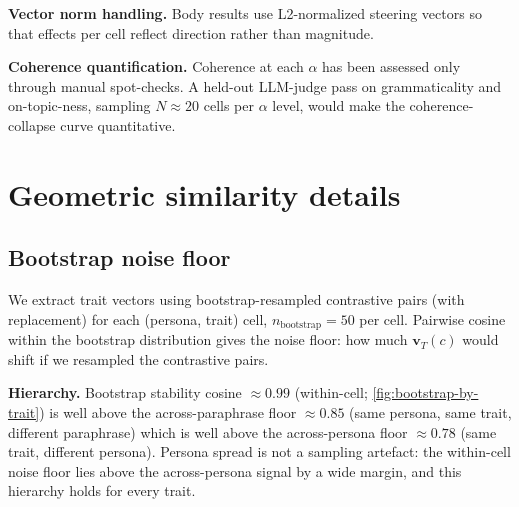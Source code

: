 \documentclass{article}
\theoremstyle{plain}
\theoremstyle{definition}
\theoremstyle{remark}
\begin{document}
\textbf{Vector norm handling.} Body results use L2-normalized steering vectors so that effects per cell reflect direction rather than magnitude.

\textbf{Coherence quantification.} Coherence at each $\alpha$ has been assessed only through manual spot-checks. A held-out LLM-judge pass on grammaticality and on-topic-ness, sampling $N \approx 20$ cells per $\alpha$ level, would make the coherence-collapse curve quantitative.

\section{Geometric similarity details}
\label{app:geo-details}

\subsection{Bootstrap noise floor}
\label{app:bootstrap}

We extract trait vectors using bootstrap-resampled contrastive pairs (with replacement) for each (persona, trait) cell, $n_{\text{bootstrap}} = 50$ per cell. Pairwise cosine within the bootstrap distribution gives the noise floor: how much $\mathbf{v}_T(c)$ would shift if we resampled the contrastive pairs.

\textbf{Hierarchy.} Bootstrap stability cosine $\approx 0.99$ (within-cell; \cref{fig:bootstrap-by-trait}) is well above the across-paraphrase floor $\approx 0.85$ (same persona, same trait, different paraphrase) which is well above the across-persona floor $\approx 0.78$ (same trait, different persona). Persona spread is not a sampling artefact: the within-cell noise floor lies above the across-persona signal by a wide margin, and this hierarchy holds for every trait.
\end{document}
